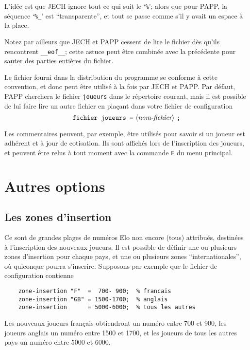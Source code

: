 \documentclass[10pt]{article}
\begin{document}
	L'id\'ee est que JECH ignore tout ce qui suit le `\verb|%|'; alors
que pour PAPP, la s\'equence `\verb|%_|' est ``transparente'', et tout se
passe comme s'il y avait un espace \`a la place. 

	Notez par ailleurs que JECH et PAPP cessent de lire le fichier
d\`es qu'ils rencontrent \verb|__eof__|; cette astuce peut \^etre
combin\'ee avec la pr\'ec\'edente pour sauter des parties enti\`eres du
fichier. 

	Le fichier fourni dans la distribution du programme se conforme
\`a cette convention, et donc peut \^etre utilis\'e \`a la fois par JECH
et PAPP.  Par d\'efaut, PAPP cherchera le fichier \verb|joueurs| dans le
r\'epertoire courant, mais il est possible de lui faire lire un autre
fichier en pla\c cant dans votre fichier de configuration
 $$\hbox{\verb|fichier joueurs =| \gram{nom-fichier} \verb|;|}$$

	Les commentaires peuvent, par exemple, \^etre utilis\'es pour
savoir si un joueur est adh\'erent et \`a jour de cotisation.  Ils sont
affich\'es lors de l'inscription des joueurs, et peuvent \^etre relus
\`a tout moment avec la commande \verb|F| du menu principal. 

\section{Autres options}

\subsection{Les zones d'insertion}

	Ce sont de grandes plages de num\'eros Elo non encore (tous)
attribu\'es, destin\'ees \`a l'inscription des nouveaux joueurs.  Il est
possible de d\'efinir une ou plusieurs zones d'insertion pour chaque
pays, et une ou plusieurs zones ``internationales'', o\`u quiconque
pourra s'inscrire.
Supposons par exemple que le fichier de configuration contienne
\begin{verbatim}
    zone-insertion "F"  =  700- 900;  % francais
    zone-insertion "GB" = 1500-1700;  % anglais
    zone-insertion      = 5000-6000;  % tous les autres
\end{verbatim}

	Les nouveaux joueurs fran{\c c}ais obtiendront un num\'ero entre
700 et 900, les joueurs anglais un num\'ero entre 1500 et 1700, et les
joueurs de tous les autres pays un num\'ero entre 5000 et 6000.
\end{document}
